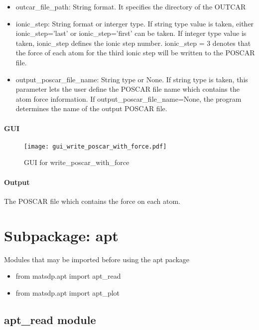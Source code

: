 \documentclass[12pt]{book}
\begin{document}
\begin{itemize}
\item outcar\_file\_path: String format. It specifies the directory of the OUTCAR
\item ionic\_step: String format or interger type. If string type value is taken, either ionic\_step='last' or ionic\_step='first' can be taken. If integer type value is taken, ionic\_step defines the ionic step number. ionic\_step = 3 denotes that the force of each atom for the third ionic step will be written to the POSCAR file.
\item output\_poscar\_file\_name: String type or None. If string type is taken, this parameter lets the user define the POSCAR file name which contains the atom force information. If output\_poscar\_file\_name=None, the program determines the name of the output POSCAR file. 
\end{itemize}

\subsubsection{GUI}

\begin{figure}[htbp]
\centering
\texttt{[image: gui\_write\_poscar\_with\_force.pdf]}
\caption{GUI for write\_poscar\_with\_force}
\label{fig:GUI_write_poscar_with_force}
\end{figure}

\subsubsection{Output}

The POSCAR file which contains the force on each atom.

\chapter{Subpackage: apt}

Modules that may be imported before using the apt package
\begin{itemize}
\item from matsdp.apt import apt\_read
\item from matsdp.apt import apt\_plot
\end{itemize}

\section{apt\_read module}
\end{document}
